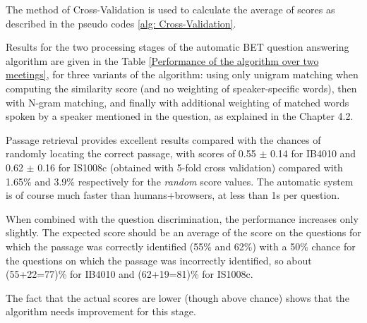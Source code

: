 %
%
%


The method of Cross-Validation is used to calculate the average of scores as described in the pseudo codes \ref{alg: Cross-Validation}.





Results for the two processing stages of the automatic BET question answering algorithm are given in the Table \ref{Performance of the algorithm over two meetings}, for three variants of the algorithm: using only unigram matching when computing the similarity score (and no weighting of speaker-specific words), then with N-gram matching, and finally with additional weighting of matched words spoken by a speaker mentioned in the question, as explained in the Chapter 4.2.

Passage retrieval provides excellent results compared with the chances of randomly locating the correct passage, with scores of 0.55 \ensuremath{\pm} 0.14 for IB4010 and 0.62 \ensuremath{\pm} 0.16 for IS1008c (obtained with 5-fold cross validation) compared with 1.65\% and 3.9\% respectively for the \textit{random} score values. The automatic system is of course much faster than humans+browsers, at less than 1s per question.

When combined with the question discrimination, the performance increases only slightly. The expected score should be an average of the score on the questions for which the passage was correctly identified (55\% and 62\%) with a 50\%  chance for the questions on which the passage was incorrectly identified, so about (55+22=77)\% for IB4010 and (62+19=81)\% for IS1008c. 

The fact that the actual scores are lower (though above chance) shows that the algorithm needs improvement for this stage.


